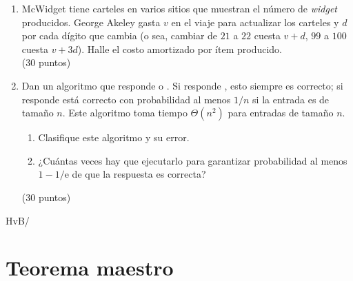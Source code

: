 \documentclass[english, spanish, fleqn]{article}
\begin{document}
\begin{enumerate}
\begin{algorithm}
{	\(p_r
	  \leftarrow \operatorname{SlowHeap}
		       (\lfloor (i + j - 1) / 2 \rfloor + 1, j - 1)\) \;
	  \Return Nodo conteniendo \(a[j]\)
	     con hijos \(p_l\) y \(p_r\) \;
      }
      \caption{\(\operatorname{SlowHeap}\)}
      \label{alg:SlowHeap}
    \end{algorithm}
    Dé la recurrencia para el tiempo de ejecución
    y resuélvala.
    \\ \hspace*{\fill}(30 puntos)
  \item %
    McWidget tiene carteles en varios sitios
    que muestran el número de \emph{\foreignlanguage{english}{widget}}
    producidos.
    George Akeley gasta \(v\) en el viaje para actualizar los carteles
    y \(d\) por cada dígito que cambia
    (o sea,
     cambiar de \(21\) a \(22\) cuesta \(v + d\),
     \(99\) a \(100\) cuesta \(v + 3 d\)).
    Halle el costo amortizado por ítem producido.
    \\ \hspace*{\fill}(30 puntos)
  \item %
    Dan un algoritmo que responde  o .
    Si responde ,
    esto siempre es correcto;
    si responde 
    está correcto con probabilidad al menos \(1/n\)
    si la entrada es de tamaño \(n\).
    Este algoritmo toma tiempo \(\Theta(n^2)\) para entradas de tamaño \(n\).
    \begin{enumerate}
    \item %
      Clasifique este algoritmo y su error.
    \item %
      ¿Cuántas veces hay que ejecutarlo para garantizar probabilidad
      al menos \(1 - 1 / \mathrm{e}\) de que la respuesta es correcta?
    \end{enumerate}
    \hspace*{\fill}(30 puntos)
  \end{enumerate}
  \vspace*{\fill}\hspace*{\fill}HvB/\LaTeXe
\pagebreak[4]
\section*{Teorema maestro}
\label{sec:teorema-maestro}
\end{document}
